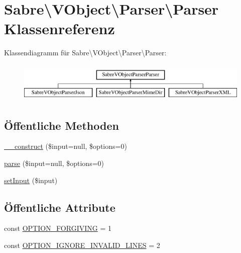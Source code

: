 \hypertarget{class_sabre_1_1_v_object_1_1_parser_1_1_parser}{}\section{Sabre\textbackslash{}V\+Object\textbackslash{}Parser\textbackslash{}Parser Klassenreferenz}
\label{class_sabre_1_1_v_object_1_1_parser_1_1_parser}
Klassendiagramm für Sabre\textbackslash{}V\+Object\textbackslash{}Parser\textbackslash{}Parser\+:\begin{figure}[H]
\begin{center}
\leavevmode
\includegraphics[height=1.895093cm]{class_sabre_1_1_v_object_1_1_parser_1_1_parser}
\end{center}
\end{figure}
\subsection*{Öffentliche Methoden}
\begin{DoxyCompactItemize}
\item 
\mbox{\hyperlink{class_sabre_1_1_v_object_1_1_parser_1_1_parser_ac9049e290f06a8101961b1b52e0145b3}{\+\_\+\+\_\+construct}} (\$input=null, \$options=0)
\item 
\mbox{\hyperlink{class_sabre_1_1_v_object_1_1_parser_1_1_parser_aedac9c34c73f6f2d76e318003df65c38}{parse}} (\$input=null, \$options=0)
\item 
\mbox{\hyperlink{class_sabre_1_1_v_object_1_1_parser_1_1_parser_a7259aca245cf12549bbb39b8b00c70b6}{set\+Input}} (\$input)
\end{DoxyCompactItemize}
\subsection*{Öffentliche Attribute}
\begin{DoxyCompactItemize}
\item 
const \mbox{\hyperlink{class_sabre_1_1_v_object_1_1_parser_1_1_parser_ae08bb9fb51b2482be33c876abc9114d3}{O\+P\+T\+I\+O\+N\+\_\+\+F\+O\+R\+G\+I\+V\+I\+NG}} = 1
\item 
const \mbox{\hyperlink{class_sabre_1_1_v_object_1_1_parser_1_1_parser_a6252ac80a839d241e57d399b4f668594}{O\+P\+T\+I\+O\+N\+\_\+\+I\+G\+N\+O\+R\+E\+\_\+\+I\+N\+V\+A\+L\+I\+D\+\_\+\+L\+I\+N\+ES}} = 2
\end{DoxyCompactItemize}
